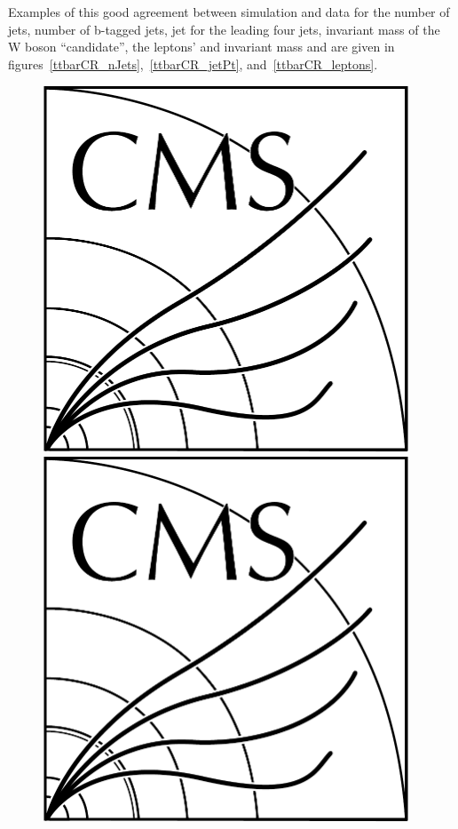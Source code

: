 Examples of this good agreement between simulation and data for the number of jets, number of b-tagged jets, jet \pT for the leading four jets, invariant mass of the W boson ``candidate'', the leptons' \pt and invariant mass and \pt are given in figures~\ref{ttbarCR_nJets},~\ref{ttbarCR_jetPt}, and~\ref{ttbarCR_leptons}.


\begin{figure}[htb]
\centering
\includegraphics[width=0.97\textwidth]{CMS-bw-logo.pdf}
\\
\includegraphics[width=0.97\textwidth]{CMS-bw-logo.pdf}

\end{figure}
